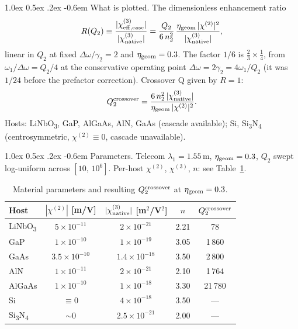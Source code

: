 \documentclass[11pt,a4paper]{article}
\makeatletter
\newcommand{\chitwo}{\chi^{(2)}}
\newcommand{\chithree}{\chi^{(3)}}
\newcommand{\Dom}{\Delta\omega}
\newcommand{\geom}{{\rm geom}}
\renewcommand\paragraph{%
  \@startsection{paragraph}{4}{\z@}%
                {1.0ex \@plus 0.5ex \@minus .2ex}%
                {-0.6em}%
                {\normalfont\itshape}}
\makeatother
\begin{document}
\paragraph{What is plotted.}
The dimensionless enhancement ratio
\begin{equation}
  R(Q_2) \equiv
  \frac{|\chithree_{\rm eff,casc}|}{|\chithree_{\rm native}|}
  = \frac{Q_2}{6\, n_2^{2}}\,
    \frac{\eta_\geom\, |\chitwo|^{2}}{|\chithree_{\rm native}|},
  \label{eq:Rdef}
\end{equation}
linear in $Q_2$ at fixed $\Dom/\gamma_2 = 2$ and $\eta_\geom = 0.3$.
The factor $1/6$ is $\tfrac23\times\tfrac14$, from $\omega_1/\Dom = Q_2/4$
at the conservative operating point $\Dom = 2\gamma_2 = 4\omega_1/Q_2$
(it was $1/24$ before the prefactor correction).
Crossover Q given by $R = 1$:
\begin{equation}
  Q_2^{\rm crossover} = \frac{6\, n_2^{2}\, |\chithree_{\rm native}|}
                              {\eta_\geom\, |\chitwo|^{2}}.
\end{equation}
Hosts: LiNbO\textsubscript{3}, GaP, AlGaAs, AlN, GaAs (cascade
available); Si, Si\textsubscript{3}N\textsubscript{4}
(centrosymmetric, $\chitwo \equiv 0$, cascade unavailable).

\paragraph{Parameters.}
Telecom $\lambda_1 = 1.55$\,\textmu m, $\eta_\geom = 0.3$, $Q_2$ swept
log-uniform across $[10,\,10^{6}]$. Per-host $\chitwo$, $\chithree$,
$n$: see Table~\ref{tab:hosts}.

\begin{table}[H]
\centering
\small\renewcommand{\arraystretch}{1.15}
\begin{tabular}{lcccc}
\toprule
Host & $|\chitwo|$ [m/V] & $|\chithree_{\rm native}|$ [m$^{2}$/V$^{2}$]
     & $n$ & $Q_2^{\rm crossover}$ \\
\midrule
LiNbO\textsubscript{3} & $5\!\times\!10^{-11}$ & $2\!\times\!10^{-21}$ & 2.21 & 78 \\
GaP        & $1\!\times\!10^{-10}$ & $1\!\times\!10^{-19}$ & 3.05 & 1\,860 \\
GaAs       & $3.5\!\times\!10^{-10}$ & $1.4\!\times\!10^{-18}$ & 3.50 & 2\,800 \\
AlN        & $1\!\times\!10^{-11}$ & $2\!\times\!10^{-21}$ & 2.10 & 1\,764 \\
AlGaAs     & $1\!\times\!10^{-10}$ & $1\!\times\!10^{-18}$ & 3.30 & 21\,780 \\
\midrule
Si         & $\equiv 0$ & $4\!\times\!10^{-18}$ & 3.50 & --- \\
Si\textsubscript{3}N\textsubscript{4} & $\sim 0$ & $2.5\!\times\!10^{-21}$ & 2.00 & --- \\
\bottomrule
\end{tabular}
\caption{Material parameters and resulting $Q_2^{\rm crossover}$
at $\eta_\geom = 0.3$.}
\label{tab:hosts}
\end{table}
\end{document}
